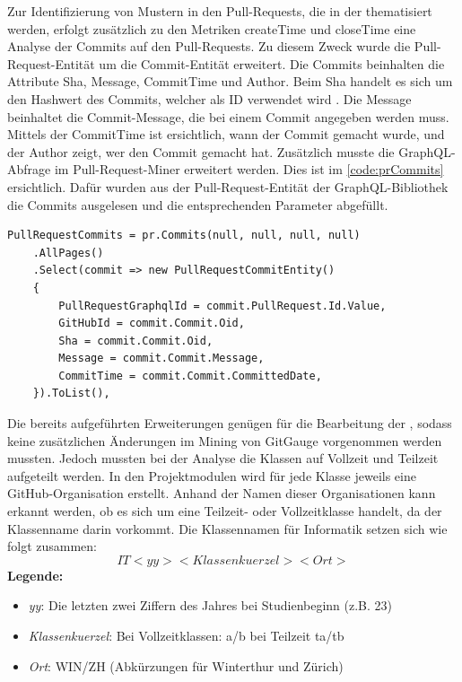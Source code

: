 Zur Identifizierung von Mustern in den Pull-Requests, die in der  thematisiert werden, erfolgt zusätzlich zu den Metriken createTime und closeTime eine Analyse der Commits auf den Pull-Requests. Zu diesem Zweck wurde die Pull-Request-Entität um die Commit-Entität erweitert. Die Commits beinhalten die Attribute Sha, Message, CommitTime und Author. Beim Sha handelt es sich um den Hashwert des Commits, welcher als ID verwendet wird \parencite{noauthor_git_nodate}. Die Message beinhaltet die Commit-Message, die bei einem Commit angegeben werden muss. Mittels der CommitTime ist ersichtlich, wann der Commit gemacht wurde, und der Author zeigt, wer den Commit gemacht hat. Zusätzlich musste die GraphQL-Abfrage im Pull-Request-Miner erweitert werden. Dies ist im \autoref{code:prCommits} ersichtlich. Dafür wurden aus der Pull-Request-Entität der GraphQL-Bibliothek die Commits ausgelesen und die entsprechenden Parameter abgefüllt.
\begin{lstlisting}[language=CSharp, caption={GraphQL-Abfrage Pull-Request-Commits}, label={code:prCommits}]
PullRequestCommits = pr.Commits(null, null, null, null)
    .AllPages()
    .Select(commit => new PullRequestCommitEntity()
    {
        PullRequestGraphqlId = commit.PullRequest.Id.Value,
        GitHubId = commit.Commit.Oid,
        Sha = commit.Commit.Oid,
        Message = commit.Commit.Message,
        CommitTime = commit.Commit.CommittedDate,
    }).ToList(),
\end{lstlisting}

Die bereits aufgeführten Erweiterungen genügen für die Bearbeitung der \linebreak {}, sodass keine zusätzlichen Änderungen im Mining von GitGauge vorgenommen werden mussten. Jedoch mussten bei der Analyse die Klassen auf Vollzeit und Teilzeit aufgeteilt werden. In den Projektmodulen wird für jede Klasse jeweils eine GitHub-Organisation erstellt. Anhand der Namen dieser Organisationen kann erkannt werden, ob es sich um eine Teilzeit- oder Vollzeitklasse handelt, da der Klassenname darin vorkommt. Die Klassennamen für Informatik setzen sich wie folgt zusammen: 
\begin{equation}
IT<yy><Klassenkuerzel><Ort>
\end{equation}
\noindent\textbf{Legende:}
\begin{itemize}
  \item \textit{yy}: Die letzten zwei Ziffern des Jahres bei Studienbeginn (z.B. 23)
  \item\textit{Klassenkuerzel}: Bei Vollzeitklassen: a/b bei Teilzeit ta/tb
  \item\textit{Ort}: WIN/ZH (Abkürzungen für Winterthur und Zürich)
\end{itemize}


